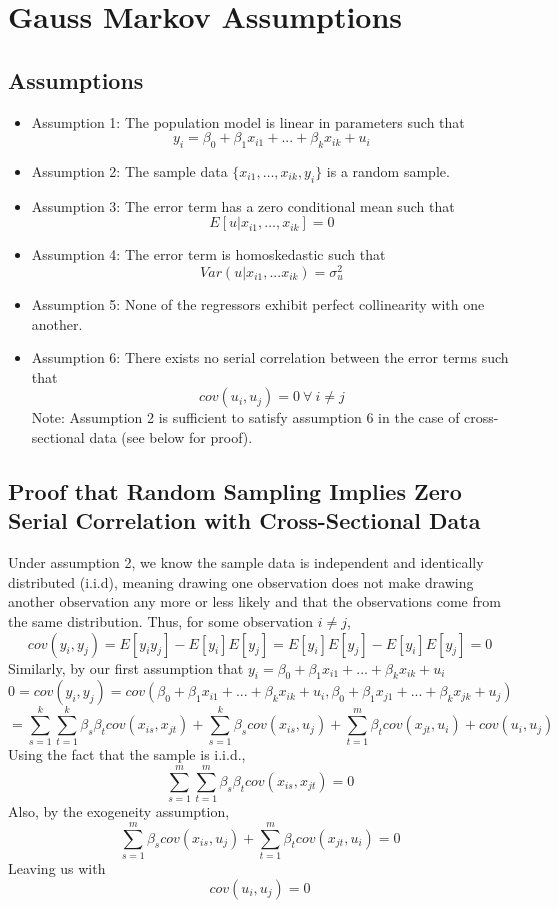 \documentclass[11pt]{article}
\begin{document}
\section*{Gauss Markov Assumptions}
\subsection*{Assumptions}
\begin{itemize}
\item Assumption 1: The population model is linear in parameters such that $$y_i=\beta_0 +\beta_1x_{i1}+...+\beta_kx_{ik}+u_i$$
\item Assumption 2: The sample data $\{x_{i1},\dots,x_{ik},y_i\}$ is a random sample.
\item Assumption 3: The error term has a zero conditional mean such that $$E[u|x_{i1},\dots,x_{ik}]=0$$
\item Assumption 4: The error term is homoskedastic such that $$Var(u|x_{i1},...x_{ik})=\sigma_u^2$$
\item Assumption 5: None of the regressors exhibit perfect collinearity with one another.
\item Assumption 6: There exists no serial correlation between the error terms such that $$cov(u_i,u_j)=0 \: \forall \: i\neq j$$Note: Assumption 2 is sufficient to satisfy assumption 6 in the case of cross-sectional data (see below for proof).
\end{itemize}
\subsection*{Proof that Random Sampling Implies Zero Serial Correlation with Cross-Sectional Data}
Under assumption 2, we know the sample data is independent and identically distributed (i.i.d), meaning drawing one observation does not make drawing another observation any more or less likely and that the observations come from the same distribution. Thus, for some observation $i\neq j$,
$$cov(y_i,y_j)=E[y_i y_j]-E[y_i]E[y_j]=E[y_i]E[y_j]-E[y_i]E[y_j]=0$$
Similarly, by our first assumption that $y_i=\beta_0+\beta_1x_{i1}+...+\beta_kx_{ik}+u_i$
$$0=cov(y_i,y_j)=cov(\beta_0+\beta_1x_{i1}+...+\beta_kx_{ik}+u_i,\beta_0+\beta_1x_{j1}+...+\beta_kx_{jk}+u_j)$$
$$=\sum_{s=1}^k \sum_{t=1}^k \beta_s \beta_t cov(x_{is},x_{jt}) + \sum_{s=1}^k \beta_s cov(x_{is},u_j) + \sum_{t=1}^m \beta_t cov(x_{jt},u_i) + cov(u_i,u_j)$$
Using the fact that the sample is i.i.d., $$\sum_{s=1}^m \sum_{t=1}^m \beta_s \beta_t cov(x_{is},x_{jt})=0$$ Also, by the exogeneity assumption, $$\sum_{s=1}^m \beta_s cov(x_{is},u_j) + \sum_{t=1}^m \beta_t cov(x_{jt},u_i)=0$$ Leaving us with $$cov(u_i,u_j)=0$$
\newpage
\end{document}
